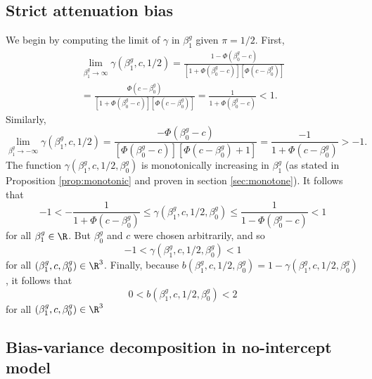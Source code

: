\documentclass[11pt]{article}
\begin{document}
\begin{appendices}
\begin{refsection}
\subsection{Strict attenuation bias}\label{sec:att_bias}

We begin by computing the limit of $\gamma$ in $\beta^g_1$ given $\pi = 1/2$.  First,
\begin{multline*}
\lim_{\beta^g_1 \to \infty} \gamma(\beta^g_1, c, 1/2) = \frac{1 - \Phi(\beta^g_0 - c)}{\left[1 + \Phi(\beta^g_0 - c) \right] \left[\Phi(c - \beta^g_0) \right]} \\ = \frac{\Phi(c - \beta^g_0)}{ \left[1 + \Phi(\beta^g_0 - c) \right] \left[\Phi(c - \beta^g_0) \right]} = \frac{1}{1 + \Phi(\beta^g_0 - c)} < 1.
\end{multline*}
Similarly,
\begin{equation*}
\lim_{\beta^g_1 \to -\infty} \gamma(\beta^g_1, c, 1/2) = \frac{ - \Phi(\beta^g_0 - c)}{\left[\Phi(\beta^g_0 - c)\right] \left[\Phi(c - \beta^g_0) + 1 \right]} = \frac{-1}{1 + \Phi(c - \beta^g_0)} > -1.
\end{equation*}
The function $\gamma(\beta^g_1, c, 1/2, \beta^g_0)$ is monotonically increasing in $\beta^g_1$ (as stated in Proposition \ref{prop:monotonic} and proven in section \ref{sec:monotone}). It follows that 
$$-1 < -\frac{1}{1 + \Phi(c - \beta^g_0)} \leq \gamma(\beta^g_1, c, 1/2, \beta^g_0) \leq \frac{1}{1 - \Phi(\beta^g_0 - c)} < 1$$ for all $\beta^g_1 \in \R$. But $\beta^g_0$ and $c$ were chosen arbitrarily, and so
$$-1 < \gamma(\beta^g_1, c, 1/2, \beta^g_0) < 1$$ for all $(\beta^g_1, c, \beta^g_0) \in \R^3$. Finally, because $b(\beta^g_1, c, 1/2, \beta^g_0) = 1 - \gamma(\beta^g_1, c, 1/2, \beta^g_0)$, it follows that
$$ 0 < b(\beta^g_1, c, 1/2, \beta^g_0) < 2$$ for all $(\beta^g_1, c, \beta^g_0) \in \R^3$

\subsection{Bias-variance decomposition in no-intercept model}\label{sec:bv_decomp}
 

\end{refsection}
\end{appendices}
\end{document}
